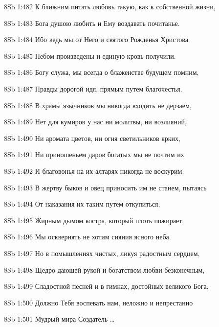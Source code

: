 \vs 8Sb 1:482 К ближним питать любовь такую, как к собственной жизни, 

\vs 8Sb 1:483 Бога душою любить и Ему воздавать почитанье. 

\vs 8Sb 1:484 Ибо ведь мы от Него и святого Рожденья Христова 

\vs 8Sb 1:485 Небом произведены и единую кровь получили.

\vs 8Sb 1:486 Богу служа, мы всегда о блаженстве будущем помним, 

\vs 8Sb 1:487 Правды дорогой идя, прямым путем благочестья. 

\vs 8Sb 1:488 В храмы язычников мы никогда входить не дерзаем, 

\vs 8Sb 1:489 Нет для кумиров у нас ни молитвы, ни возлияний, 

\vs 8Sb 1:490 Ни аромата цветов, ни огня светильников ярких,

\vs 8Sb 1:491 Ни приношеньем даров богатых мы не почтим их 

\vs 8Sb 1:492 И благовонья на их алтарях никогда не воскурим; 

\vs 8Sb 1:493 В жертву быков и овец приносить им не станем, пытаясь 

\vs 8Sb 1:494 От наказания их таким путем откупиться; 

\vs 8Sb 1:495 Жирным дымом костра, который плоть пожирает,

\vs 8Sb 1:496 Мы осквернять не хотим сияния ясного неба.

\vs 8Sb 1:497 Но в помышлениях чистых, ликуя радостным сердцем, 

\vs 8Sb 1:498 Щедро дающей рукой и богатством любви безконечным, 

\vs 8Sb 1:499 Сладостной песней и в гимнах, достойных великого Бога, 

\vs 8Sb 1:500 Должно Тебя воспевать нам, неложно и непрестанно 

\vs 8Sb 1:501 Мудрый мира Создатель \ldots
